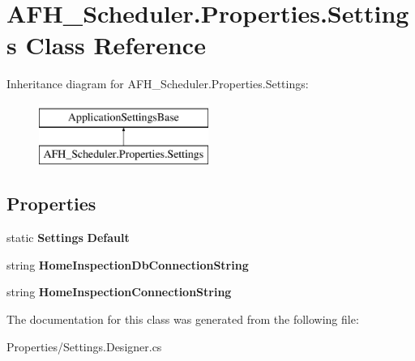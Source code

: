 \section{A\+F\+H\+\_\+\+Scheduler.\+Properties.\+Settings Class Reference}
\label{class_a_f_h___scheduler_1_1_properties_1_1_settings}
Inheritance diagram for A\+F\+H\+\_\+\+Scheduler.\+Properties.\+Settings\+:\begin{figure}[H]
\begin{center}
\leavevmode
\includegraphics[height=2.000000cm]{class_a_f_h___scheduler_1_1_properties_1_1_settings}
\end{center}
\end{figure}
\subsection*{Properties}
\begin{DoxyCompactItemize}
\item 
\mbox{\label{class_a_f_h___scheduler_1_1_properties_1_1_settings_aee8077496e2cca9e3cb5bcf94745e769}} 
static \textbf{ Settings} {\bfseries Default}\hspace{0.3cm}{\ttfamily  [get]}
\item 
\mbox{\label{class_a_f_h___scheduler_1_1_properties_1_1_settings_a04bb4e7068c576a721d5724c1f7b3f8f}} 
string {\bfseries Home\+Inspection\+Db\+Connection\+String}\hspace{0.3cm}{\ttfamily  [get]}
\item 
\mbox{\label{class_a_f_h___scheduler_1_1_properties_1_1_settings_a7912e144ec430fa0755250b3feb46533}} 
string {\bfseries Home\+Inspection\+Connection\+String}\hspace{0.3cm}{\ttfamily  [get]}
\end{DoxyCompactItemize}


The documentation for this class was generated from the following file\+:\begin{DoxyCompactItemize}
\item 
Properties/Settings.\+Designer.\+cs\end{DoxyCompactItemize}
